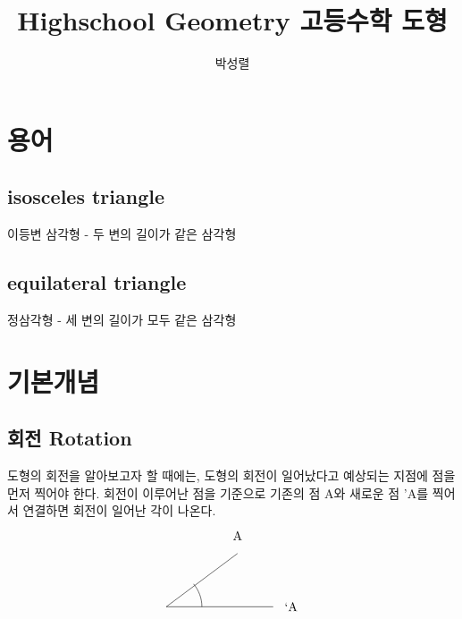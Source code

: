 \documentclass{article}
\title{Highschool Geometry 고등수학 도형}
\author{박성렬}
\begin{document}
\maketitle
{}
\section{용어}
\subsection{isosceles triangle}
이등변 삼각형 - 두 변의 길이가 같은 삼각형
\subsection{equilateral triangle}
정삼각형 - 세 변의 길이가 모두 같은 삼각형

\section{기본개념}
\subsection{회전 Rotation}
도형의 회전을 알아보고자 할 때에는, 도형의 회전이 일어났다고 예상되는 지점에 점을 먼저 찍어야 한다. 회전이 이루어난 점을 기준으로 기존의 점 A와 새로운 점 'A를 찍어서 연결하면 회전이 일어난 각이 나온다.\\
$$
\begin{tikzpicture}

\draw (1,3) -- (-1,1.5) -- (2,1.5);
\node at (1,3.5) {\\A};
\node at (-1,1.5) {};
\node at (2.5,1.5) {\\`A};
\draw (-0.234,2.1428) arc (40.0022:0:1);
\end{tikzpicture}
$$
\end{document}
